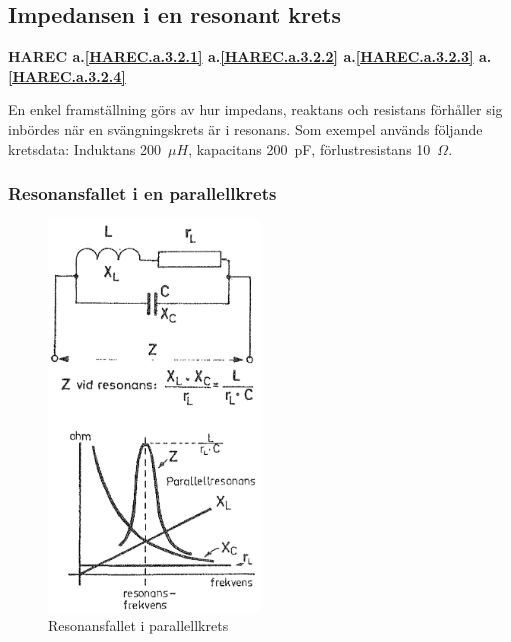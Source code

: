 \subsection{Impedansen i en resonant krets}
\textbf{HAREC
  a.\ref{HAREC.a.3.2.1}\label{myHAREC.a.3.2.1b}
  a.\ref{HAREC.a.3.2.2}\label{myHAREC.a.3.2.2b}
  a.\ref{HAREC.a.3.2.3}\label{myHAREC.a.3.2.3}
  a.\ref{HAREC.a.3.2.4}\label{myHAREC.a.3.2.4b}
}

En enkel framställning görs av hur impedans, reaktans och resistans förhåller
sig inbördes när en svängningskrets är i resonans.
Som exempel används följande kretsdata: Induktans 200~\(\mu H\),
kapacitans 200~pF, förlustresistans 10~\(\Omega\).

\subsubsection{Resonansfallet i en parallellkrets}
\label{parallellresonans}

\begin{figure}[ht]
\begin{center}
  \includegraphics[width=0.5\textwidth]{images/cropped_pdfs/bild_2_3-18.pdf}
  \caption{Resonansfallet i parallellkrets}
  \label{fig:BildII3-18}
\end{center}
\end{figure}


